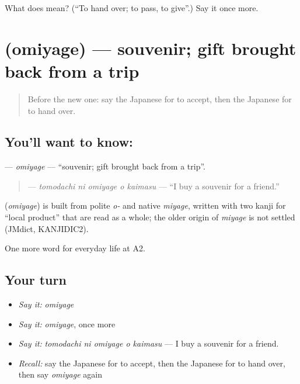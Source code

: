 \begin{tcolorbox}[breakable,colback=teal!4,colframe=teal!35!black,title={Before you move on}]
What does  mean? (\textquotedblleft{}To hand over; to pass, to give\textquotedblright{}.) Say it once more.
\end{tcolorbox}
\section[\texorpdfstring{\ja{おみやげ} (omiyage)}{おみやげ (omiyage)}]{ (omiyage) — souvenir; gift brought back from a trip}

\label{lesson:JA-C189-omiyage}



\begin{quote}
Before the new one: say the Japanese for to accept, then the Japanese for to hand over.
\end{quote}

\subsection*{You'll want to know: }
\textbf{} — \emph{omiyage} — \textquotedblleft{}souvenir; gift brought back from a trip\textquotedblright{}.

\begin{quote}
\textbf{  } — \emph{tomodachi ni omiyage o kaimasu} — \textquotedblleft{}I buy a souvenir for a friend.\textquotedblright{}
\end{quote}

\begin{cousinweb}
\textbf{} (\emph{omiyage}) is built from polite \emph{o-} and native \emph{miyage}, written with two kanji for \textquotedblleft{}local product\textquotedblright{} that are read as a whole; the older origin of \emph{miyage} is not settled (JMdict, KANJIDIC2).
\end{cousinweb}

\begin{grammarlens}[title={What you've built}]
One more word for everyday life at A2.
\end{grammarlens}

\subsection*{Your turn}
\begin{itemize}
\raggedright
  \item \emph{Say it:} \emph{omiyage}
  \item \emph{Say it:} \emph{omiyage}, once more
  \item \emph{Say it:} \emph{tomodachi ni omiyage o kaimasu} — I buy a souvenir for a friend.
  \item \emph{Recall:} say the Japanese for to accept, then the Japanese for to hand over, then say \emph{omiyage} again
\end{itemize}

